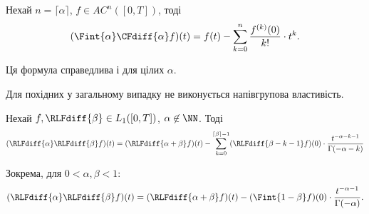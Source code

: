 \begin{theorem}
    Нехай $n = \lceil \alpha \rceil$, $f \in AC^n([0,T])$, тоді
    \begin{equation}
        (\Fint{\alpha} \CFdiff{\alpha} f)(t) = f(t) - \sum_{k = 0}^n \frac{f^{(k)}(0)}{k!} \cdot t^k.
    \end{equation}
\end{theorem}

\begin{remark}
    Ця формула справедлива і для цілих $\alpha$.
\end{remark}

\begin{proposition}
    Для похідних у загальному випадку не виконується напівгрупова властивість.
\end{proposition}

\begin{theorem}
    Нехай $f, \RLFdiff{\beta} \in L_1([0, T])$, $\alpha \not\in \NN$. Тоді
    \begin{equation}
        (\RLFdiff{\alpha} \RLFdiff{\beta} f)(t) = (\RLFdiff{\alpha + \beta} f) (t) - \sum_{k = 0}^{\lceil \beta \rceil - 1} (\RLFdiff{\beta - k - 1} f)(0) \cdot \frac{t^{-\alpha - k - 1}}{\Gamma(-\alpha - k)}
    \end{equation}
\end{theorem}

\begin{example}
    Зокрема, для $0 < \alpha, \beta < 1$:
    \begin{equation}
        ( \RLFdiff{\alpha} \RLFdiff{\beta} f ) (t) = ( \RLFdiff{\alpha + \beta} f ) (t) - ( \Fint{1 - \beta} f ) (0) \cdot \frac{t^{-\alpha - 1}}{\Gamma(-\alpha)}.
    \end{equation}
\end{example}

